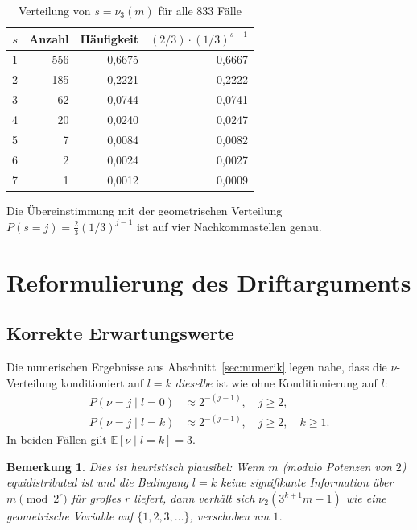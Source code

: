\documentclass[12pt,a4paper]{article}
\newtheorem{bemerkung}[definition]{Bemerkung}
\newcommand{\vii}{\nu_2}
\newcommand{\viii}{\nu_3}
\newcommand{\E}{\mathbb{E}}
\begin{document}
\begin{table}[h!]
\centering
\caption{Verteilung von $s = \viii(m)$ für alle 833 Fälle}
\label{tab:s_verteilung}
\renewcommand{\arraystretch}{1.3}
\begin{tabular}{r r r r}
\toprule
$s$ & Anzahl & Häufigkeit & $(2/3)\cdot(1/3)^{s-1}$ \\
\midrule
1 & 556 & 0,6675 & 0,6667 \\
2 & 185 & 0,2221 & 0,2222 \\
3 &  62 & 0,0744 & 0,0741 \\
4 &  20 & 0,0240 & 0,0247 \\
5 &   7 & 0,0084 & 0,0082 \\
6 &   2 & 0,0024 & 0,0027 \\
7 &   1 & 0,0012 & 0,0009 \\
\bottomrule
\end{tabular}
\end{table}

Die Übereinstimmung mit der geometrischen Verteilung
$P(s{=}j) = \tfrac{2}{3}(1/3)^{j-1}$ ist auf vier Nachkommastellen genau.

\section{Reformulierung des Driftarguments}
\label{sec:drift_korrektur}

\subsection{Korrekte Erwartungswerte}

Die numerischen Ergebnisse aus Abschnitt~\ref{sec:numerik} legen nahe,
dass die $\nu$-Verteilung konditioniert auf $l = k$ \emph{dieselbe} ist
wie ohne Konditionierung auf $l$:
\begin{align*}
  P(\nu = j \mid l = 0) &\approx 2^{-(j-1)}, \quad j \geq 2, \\
  P(\nu = j \mid l = k) &\approx 2^{-(j-1)}, \quad j \geq 2, \quad k \geq 1.
\end{align*}
In beiden Fällen gilt $\E[\nu \mid l{=}k] = 3$.

\begin{bemerkung}
Dies ist heuristisch plausibel: Wenn $m$ (modulo Potenzen von $2$) equidistributed
ist und die Bedingung $l = k$ keine signifikante Information über $m \pmod{2^r}$
für großes $r$ liefert, dann verhält sich $\vii(3^{k+1}m - 1)$ wie eine
geometrische Variable auf $\{1, 2, 3, \ldots\}$, verschoben um $1$.
\end{bemerkung}
\end{document}
